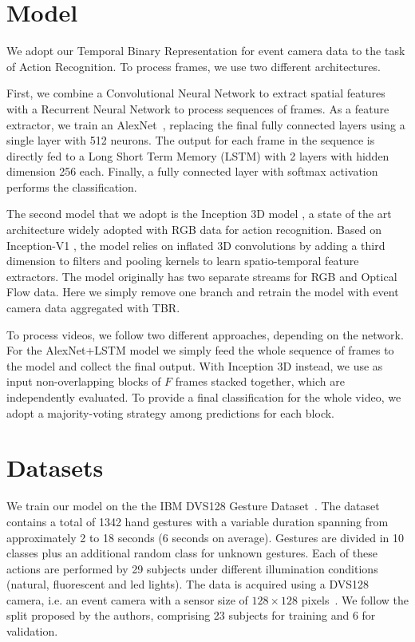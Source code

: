 \documentclass[a4paper,conference]{IEEEtran}
\begin{document}
\section{Model}
\label{sec:model}
We adopt our Temporal Binary Representation for event camera data to the task of Action Recognition. To process frames, we use two different architectures.

First, we combine a Convolutional Neural Network to extract spatial features with a Recurrent Neural Network to process sequences of frames. As a feature extractor, we train an AlexNet~\cite{krizhevsky2012imagenet}, replacing the final fully connected layers using a single layer with 512 neurons. The output for each frame in the sequence is directly fed to a Long Short Term Memory (LSTM) with 2 layers with hidden dimension 256 each. Finally, a fully connected layer with softmax activation performs the classification.

The second model that we adopt is the Inception 3D model \cite{carreira2017quo}, a state of the art architecture widely adopted with RGB data for action recognition. Based on Inception-V1 \cite{szegedy2015going}, the model relies on inflated 3D convolutions by adding a third dimension to filters and pooling kernels to learn spatio-temporal feature extractors. The model originally has two separate streams for RGB and Optical Flow data. Here we simply remove one branch and retrain the model with event camera data aggregated with TBR.

To process videos, we follow two different approaches, depending on the network. For the AlexNet+LSTM model we simply feed the whole sequence of frames to the model and collect the final output. With Inception 3D instead, we use as input non-overlapping blocks of $F$ frames stacked together, which are independently evaluated. To provide a final classification for the whole video, we adopt a majority-voting strategy among predictions for each block.



\section{Datasets}
\label{sec:dataset}
We train our model on the the IBM DVS128 Gesture Dataset~\cite{amir2017low}. The dataset contains a total of 1342 hand gestures with a variable duration spanning from approximately 2 to 18 seconds (6 seconds on average). Gestures are divided in 10 classes plus an additional random class for unknown gestures. Each of these actions are performed by 29 subjects under different illumination conditions (natural, fluorescent and led lights). The data is acquired using a DVS128 camera, i.e. an event camera with a sensor size of $128 \times 128$ pixels~\cite{lichtsteiner2006128}. We follow the split proposed by the authors, comprising 23 subjects for training and 6 for validation.
\end{document}
